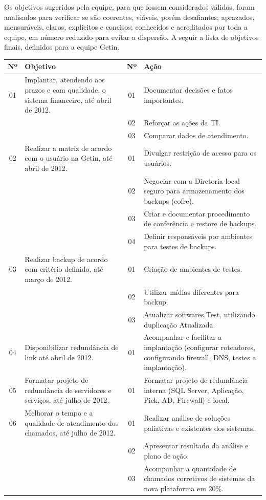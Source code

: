 \documentclass{article}
\begin{document}
Os objetivos sugeridos pela equipe, para que fossem considerados válidos, foram analisados para verificar se são coerentes, viáveis, porém desafiantes; aprazados, mensuráveis, claros, explícitos e concisos; conhecidos e acreditados por toda a equipe, em número reduzido para evitar a dispersão. A seguir a lista de objetivos finais, definidos para a equipe Getin.

\begin{longtable}{|c|p{5cm}|c|p{8cm}|}
\toprule
Nº & Objetivo & Nº & Ação \\
\midrule
01 & Implantar, atendendo aos prazos e com qualidade, o sistema financeiro, até abril de 2012. & 01 & Documentar decisões e fatos importantes. \\
 & & 02 & Reforçar as ações da TI. \\
 & & 03 & Comparar dados de atendimento. \\
02 & Realizar a matriz de acordo com o usuário na Getin, até abril de 2012. & 01 & Divulgar restrição de acesso para os usuários. \\
 & & 02 & Negociar com a Diretoria local seguro para armazenamento dos backups (cofre). \\
 & & 03 & Criar e documentar procedimento de conferência e restore de backups. \\
 & & 04 & Definir responsáveis por ambientes para testes de backups. \\
03 & Realizar backup de acordo com critério definido, até março de 2012. & 01 & Criação de ambientes de testes. \\
 & & 02 & Utilizar mídias diferentes para backup. \\
 & & 03 & Atualizar softwares Test, utilizando duplicação Atualizada. \\
04 & Disponibilizar redundância de link até abril de 2012. & 01 & Acompanhar e facilitar a implantação (configurar roteadores, configurando firewall, DNS, testes e implantação). \\
05 & Formatar projeto de redundância de servidores e serviços, até julho de 2012. & 01 & Formatar projeto de redundância interna (SQL Server, Aplicação, Pick, AD, Firewall) e local. \\
06 & Melhorar o tempo e a qualidade de atendimento dos chamados, até julho de 2012. & 01 & Realizar análise de soluções paliativas e existentes dos sistemas. \\
 & & 02 & Apresentar resultado da análise e plano de ação. \\
 & & 03 & Acompanhar a quantidade de chamados corretivos de sistemas da nova plataforma em 20\%. \\

\end{longtable}
\end{document}
